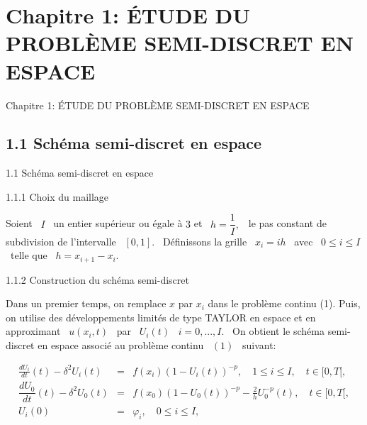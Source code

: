 \documentclass[10pt]{beamer}
\begin{document}
\section{Chapitre 1: ÉTUDE DU PROBLÈME SEMI-DISCRET EN ESPACE}
\begin{frame}{Chapitre 1: ÉTUDE DU PROBLÈME SEMI-DISCRET EN ESPACE}

\subsection{1.1 Schéma semi-discret en espace}
\begin{block}{1.1 Schéma semi-discret en espace}\end{block}
\begin{block}{1.1.1 Choix du maillage}\end{block}
  Soient \ $I$ \ un entier supérieur ou égale à $3$ et \ $h= \dfrac{1}{I} ,$ \ le pas constant de subdivision de l'intervalle \ $ [0, 1] .$ \ Définissons la grille \ $x_i=ih$ \ avec \ $0\leqslant i \leqslant I$ \ telle que \ $h=x_{i+1}-x_i .$\ \\
  
\end{frame}
\begin{frame}
\begin{block}{1.1.2 Construction du schéma semi-discret}\end{block}
 Dans un premier temps, on remplace $x$ par $x_i$ dans le problème continu (1). Puis, on utilise des développements limités de type TAYLOR en espace et en approximant \ $u(x_i,t)$ \  par \ $U_i(t)$ \  \quad $i=0,...,I$. \ On obtient le schéma semi-discret en espace associé au problème continu \ $(1)$ \ suivant: \\
\begin{block}

  \begin{eqnarray}
   \frac{dU_{i}}{dt}(t)-\delta^{2}U_{i}(t)&=&f(x_{i})(1-U_{i}(t)) ^{-p},\quad 1\leqslant i\leqslant I, \quad t\in [0,T[, \label{eqq4}\\
		\dfrac{dU_0}{dt}(t)-\delta^{2}U_0(t)&=& f(x_{0})(1-U_{0}(t))^{-p}-\frac{2}{h} U_{0}^{-p}(t) ,\quad t\in [0,T[,\label{eqq5}\\       
		U_{i}(0)&=&\varphi_{i}, \quad 0\leqslant i\leqslant I,\label{eqq6}
    \end{eqnarray}
   \end{block}
      
    \end{frame}
\end{document}
